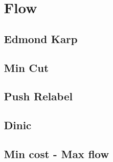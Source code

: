 \newpage
\section{Flow}
\subsection{Edmond Karp}

\newpage
\subsection{Min Cut}

\subsection{Push Relabel}

\newpage
\subsection{Dinic}

\subsection{Min cost - Max flow}

